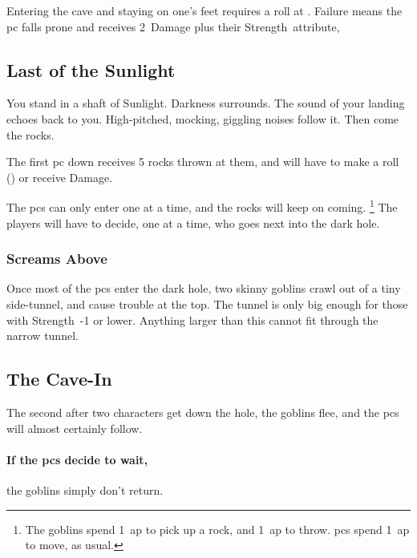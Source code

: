 \begin{multicols}{2}
Entering the cave and staying on one's feet requires a  roll at \tn[6].
Failure means the \gls{pc} falls prone%
and receives 2~Damage plus their Strength~\gls{attribute},

\label{goblinCaveEntrance}

\renewcommand\npcsymbol{\gls{night}}

\subsection{Last of the Sunlight}

\begin{boxtext}
  You stand in a shaft of Sunlight.
  Darkness surrounds.
  The sound of your landing echoes back to you.
  High-pitched, mocking, giggling noises follow it.
  Then come the rocks.
\end{boxtext}

The first \gls{pc} down receives 5 rocks thrown at them, and will have to make a  roll (\tn[10]) or receive  Damage.

The \glspl{pc} can only enter one at a time, and the rocks will keep on coming.%
\footnote{The goblins spend 1~\gls{ap} to pick up a rock, and 1~\gls{ap} to throw.
\Glspl{pc} spend 1~\gls{ap} to move, as usual.}
The players will have to decide, one at a time, who goes next into the dark hole.

\playCommentaryDust[t]

\subsubsection{Screams Above}

Once most of the \glspl{pc} enter the dark hole, two skinny goblins crawl out of a tiny side-tunnel, and cause trouble at the top.
The tunnel is only big enough for those with Strength~-1 or lower.
Anything larger than this cannot fit through the narrow tunnel.

\subsection{The Cave-In}

The second after two characters get down the hole, the goblins flee, and the \glspl{pc} will almost certainly follow.

\paragraph{If the \glspl{pc} decide to wait,}
the goblins simply don't return.


\end{multicols}
